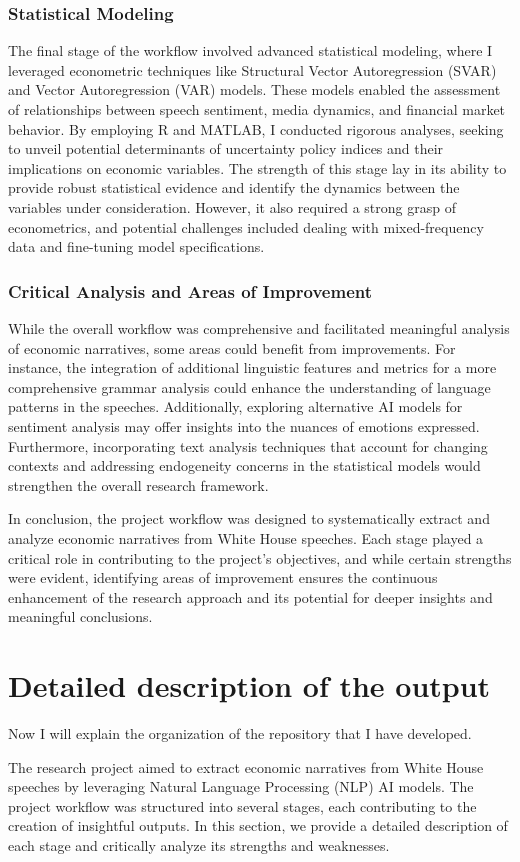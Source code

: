 \documentclass{article}
\begin{document}
\subsubsection{Statistical Modeling}
The final stage of the workflow involved advanced statistical modeling, where I leveraged econometric techniques like Structural Vector Autoregression (SVAR) and Vector Autoregression (VAR) models. These models enabled the assessment of relationships between speech sentiment, media dynamics, and financial market behavior. By employing R and MATLAB, I conducted rigorous analyses, seeking to unveil potential determinants of uncertainty policy indices and their implications on economic variables. The strength of this stage lay in its ability to provide robust statistical evidence and identify the dynamics between the variables under consideration. However, it also required a strong grasp of econometrics, and potential challenges included dealing with mixed-frequency data and fine-tuning model specifications.

\subsubsection{Critical Analysis and Areas of Improvement}
While the overall workflow was comprehensive and facilitated meaningful analysis of economic narratives, some areas could benefit from improvements. For instance, the integration of additional linguistic features and metrics for a more comprehensive grammar analysis could enhance the understanding of language patterns in the speeches. Additionally, exploring alternative AI models for sentiment analysis may offer insights into the nuances of emotions expressed. Furthermore, incorporating text analysis techniques that account for changing contexts and addressing endogeneity concerns in the statistical models would strengthen the overall research framework.
\par
In conclusion, the project workflow was designed to systematically extract and analyze economic narratives from White House speeches. Each stage played a critical role in contributing to the project's objectives, and while certain strengths were evident, identifying areas of improvement ensures the continuous enhancement of the research approach and its potential for deeper insights and meaningful conclusions.



\section{Detailed description of the output}
Now I will explain the organization of the repository that I have developed. 
\par
The research project aimed to extract economic narratives from White House speeches by leveraging Natural Language Processing (NLP) AI models. The project workflow was structured into several stages, each contributing to the creation of insightful outputs. In this section, we provide a detailed description of each stage and critically analyze its strengths and weaknesses.
\par
\end{document}

